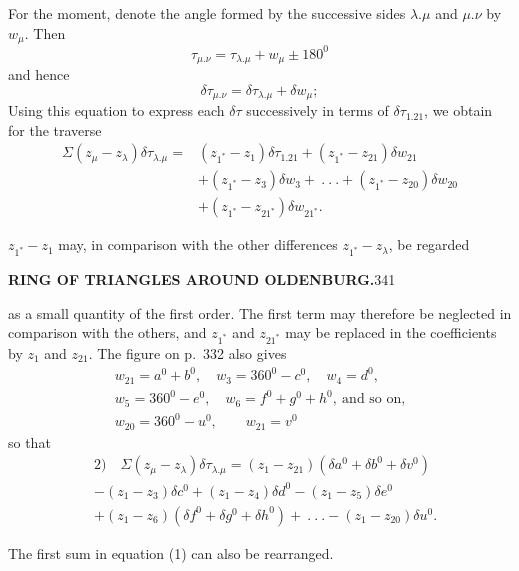 \par\noindent\hspace*{\parindent}For the moment, denote the angle formed by the successive sides \(\lambda.\mu\) and \(\mu.\nu\) by \(w_\mu\). Then
\[
\tau_{\mu.\nu}=\tau_{\lambda.\mu}+w_\mu\pm180^0
\]
\noindent and hence
\[
\delta\tau_{\mu.\nu}=\delta\tau_{\lambda.\mu}+\delta w_\mu;
\]
\noindent Using this equation to express each \(\delta\tau\) successively in terms of \(\delta\tau_{1.21}\), we obtain for the traverse
\[
\begin{aligned}
\Sigma(z_\mu-z_\lambda)\delta\tau_{\lambda.\mu}={}&(z_{1^*}-z_1)\delta\tau_{1.21}+(z_{1^*}-z_{21})\delta w_{21}\\
&+(z_{1^*}-z_3)\delta w_3+\ .\ .\ .+(z_{1^*}-z_{20})\delta w_{20}\\
&+(z_{1^*}-z_{21^*})\delta w_{21^*}.
\end{aligned}
\]
\par\noindent\hspace*{\parindent}\(z_{1^*}-z_1\) may, in comparison with the other differences \(z_{1^*}-z_\lambda\), be regarded
\par\clearpage
\noindent\textbf{RING OF TRIANGLES AROUND OLDENBURG.}\hfill341\par\medskip
\enlargethispage{1.5\baselineskip}
\begingroup\small\setlength{\jot}{1pt}\setlength{\abovedisplayskip}{4pt}\setlength{\belowdisplayskip}{4pt}
\setlength{\abovedisplayshortskip}{2pt}\setlength{\belowdisplayshortskip}{3pt}
\noindent as a small quantity of the first order. The first term may therefore be neglected in comparison with the others, and \(z_{1^*}\) and \(z_{21^*}\) may be replaced in the coefficients by \(z_1\) and \(z_{21}\). The figure on p.~332 also gives
\[
\begin{gathered}
w_{21}=a^0+b^0,\quad w_3=360^0-c^0,\quad w_4=d^0,\\
w_5=360^0-e^0,\quad w_6=f^0+g^0+h^0,\ \text{and so on,}\\
w_{20}=360^0-u^0,\qquad w_{21}=v^0
\end{gathered}
\]
\noindent so that
\[
\begin{aligned}
&2)\quad\Sigma(z_\mu-z_\lambda)\delta\tau_{\lambda.\mu}=(z_1-z_{21})(\delta a^0+\delta b^0+\delta v^0)\\
&-(z_1-z_3)\delta c^0+(z_1-z_4)\delta d^0-(z_1-z_5)\delta e^0\\
&+(z_1-z_6)(\delta f^0+\delta g^0+\delta h^0)\!+\ .\ .\ .-(z_1-z_{20})\delta u^0.
\end{aligned}
\]
\par\noindent\hspace*{\parindent}The first sum in equation (1) can also be rearranged.

